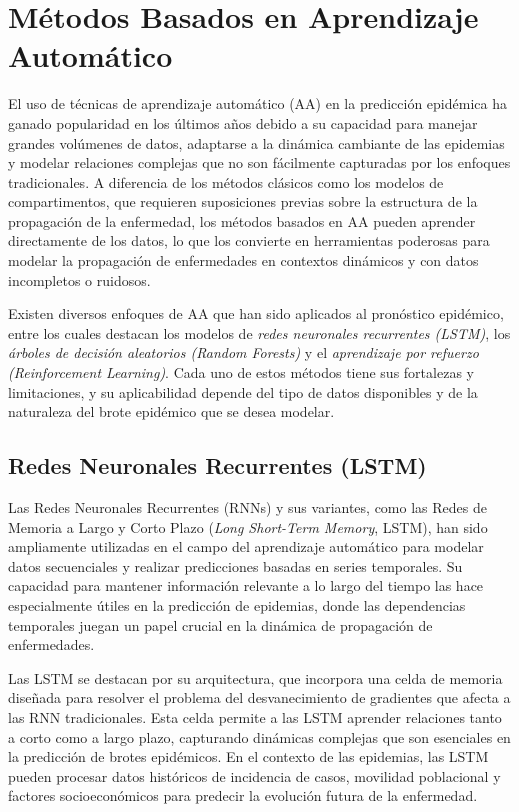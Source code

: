 \section{Métodos Basados en Aprendizaje Automático}\label{section:machine-learning-methods}

El uso de técnicas de aprendizaje automático (AA) en la predicción epidémica ha ganado popularidad en los últimos años debido a su capacidad para manejar grandes volúmenes de datos, adaptarse a la dinámica cambiante de las epidemias y modelar relaciones complejas que no son fácilmente capturadas por los enfoques tradicionales. A diferencia de los métodos clásicos como los modelos de compartimentos, que requieren suposiciones previas sobre la estructura de la propagación de la enfermedad, los métodos basados en AA pueden aprender directamente de los datos, lo que los convierte en herramientas poderosas para modelar la propagación de enfermedades en contextos dinámicos y con datos incompletos o ruidosos.

Existen diversos enfoques de AA que han sido aplicados al pronóstico epidémico, entre los cuales destacan los modelos de \textit{redes neuronales recurrentes (LSTM)}, los \textit{árboles de decisión aleatorios (Random Forests)} y el \textit{aprendizaje por refuerzo (Reinforcement Learning)}. Cada uno de estos métodos tiene sus fortalezas y limitaciones, y su aplicabilidad depende del tipo de datos disponibles y de la naturaleza del brote epidémico que se desea modelar.

\subsection{Redes Neuronales Recurrentes (LSTM)}

Las Redes Neuronales Recurrentes (RNNs) y sus variantes, como las Redes de Memoria a Largo y Corto Plazo (\textit{Long Short-Term Memory}, LSTM), han sido ampliamente utilizadas en el campo del aprendizaje automático para modelar datos secuenciales y realizar predicciones basadas en series temporales. Su capacidad para mantener información relevante a lo largo del tiempo las hace especialmente útiles en la predicción de epidemias, donde las dependencias temporales juegan un papel crucial en la dinámica de propagación de enfermedades.

Las LSTM se destacan por su arquitectura, que incorpora una celda de memoria diseñada para resolver el problema del desvanecimiento de gradientes que afecta a las RNN tradicionales. Esta celda permite a las LSTM aprender relaciones tanto a corto como a largo plazo, capturando dinámicas complejas que son esenciales en la predicción de brotes epidémicos. En el contexto de las epidemias, las LSTM pueden procesar datos históricos de incidencia de casos, movilidad poblacional y factores socioeconómicos para predecir la evolución futura de la enfermedad.

